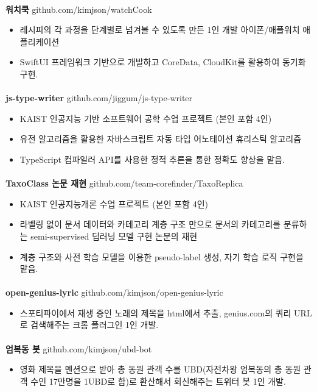\documentclass{article}
\begin{document}
\paragraph{}
\textbf{워치쿡} \hfill github.com/kimjson/watchCook
\begin{itemize}
    \setlength\itemsep{0.1em}
    \item 레시피의 각 과정을 단계별로 넘겨볼 수 있도록 만든 1인 개발 아이폰/애플워치 애플리케이션
    \item SwiftUI 프레임워크 기반으로 개발하고 CoreData, CloudKit를 활용하여 동기화 구현.
\end{itemize}
\paragraph{}
\textbf{js-type-writer} \hfill github.com/jiggum/js-type-writer
\begin{itemize}
    \setlength\itemsep{0.1em}
    \item KAIST 인공지능 기반 소프트웨어 공학 수업 프로젝트 (본인 포함 4인)
    \item 유전 알고리즘을 활용한 자바스크립트 자동 타입 어노테이션 휴리스틱 알고리즘
    \item TypeScript 컴파일러 API를 사용한 정적 추론을 통한 정확도 향상을 맡음.
\end{itemize}
\paragraph{}
\textbf{TaxoClass 논문 재현} \hfill github.com/team-corefinder/TaxoReplica
\begin{itemize}
    \setlength\itemsep{0.1em}
    \item KAIST 인공지능개론 수업 프로젝트 (본인 포함 4인)
    \item 라벨링 없이 문서 데이터와 카테고리 계층 구조 만으로 문서의 카테고리를 분류하는 semi-supervised 딥러닝 모델 구현 논문의 재현
    \item 계층 구조와 사전 학습 모델을 이용한 pseudo-label 생성, 자기 학습 로직 구현을 맡음.
\end{itemize}
\paragraph{}
\textbf{open-genius-lyric} \hfill github.com/kimjson/open-genius-lyric
\begin{itemize}
    \setlength\itemsep{0.1em}
    \item 스포티파이에서 재생 중인 노래의 제목을 html에서 추출, genius.com의 쿼리 URL로 검색해주는 크롬 플러그인 1인 개발.
\end{itemize}
\paragraph{}
\textbf{엄복동 봇} \hfill github.com/kimjson/ubd-bot
\begin{itemize}
    \setlength\itemsep{0.1em}
    \item 영화 제목을 멘션으로 받아 총 동원 관객 수를 UBD(자전차왕 엄복동의 총 동원 관객 수인 17만명을 1UBD로 함)로 환산해서 회신해주는 트위터 봇 1인 개발.
\end{itemize}
\end{document}

